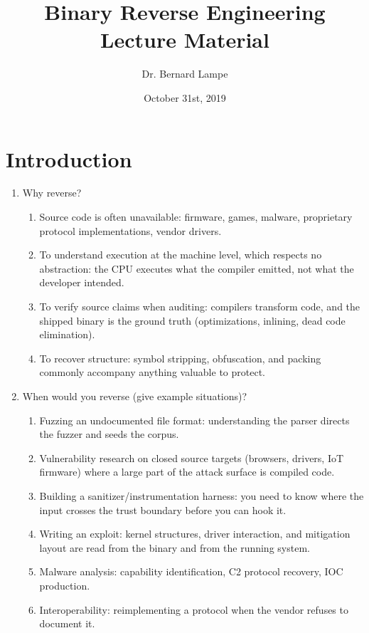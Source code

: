 \documentclass[12pt]{Training}
\title{Binary Reverse Engineering Lecture Material}
\author{Dr. Bernard Lampe}
\date{October 31st, 2019}
\begin{document}
\maketitle


\section*{Introduction}
\begin{enumerate}
    \item Why reverse?
    \begin{enumerate}
        \item Source code is often unavailable: firmware, games, malware, proprietary protocol implementations, vendor drivers.
        \item To understand execution at the machine level, which respects no abstraction: the CPU executes what the compiler emitted, not what the developer intended.
        \item To verify source claims when auditing: compilers transform code, and the shipped binary is the ground truth (optimizations, inlining, dead code elimination).
        \item To recover structure: symbol stripping, obfuscation, and packing commonly accompany anything valuable to protect.
    \end{enumerate}
    \item When would you reverse (give example situations)?
    \begin{enumerate}
        \item Fuzzing an undocumented file format: understanding the parser directs the fuzzer and seeds the corpus.
        \item Vulnerability research on closed source targets (browsers, drivers, IoT firmware) where a large part of the attack surface is compiled code.
        \item Building a sanitizer/instrumentation harness: you need to know where the input crosses the trust boundary before you can hook it.
        \item Writing an exploit: kernel structures, driver interaction, and mitigation layout are read from the binary and from the running system.
        \item Malware analysis: capability identification, C2 protocol recovery, IOC production.
        \item Interoperability: reimplementing a protocol when the vendor refuses to document it.

\end{enumerate}
\end{enumerate}
\end{document}
